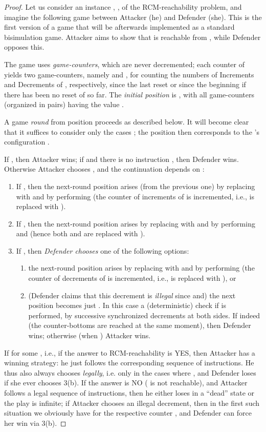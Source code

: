 \documentclass[a4paper,11pt]{article}
\begin{document}
\begin{proof}
Let us consider an instance ,
,  of the RCM-reachability problem,
and imagine the
following game between Attacker (he) and Defender (she). This is the first
version of a game that will be afterwards
implemented as a standard bisimulation game.
Attacker aims to show that  is reachable from 
, while 
Defender opposes this.

The game uses  \emph{game-counters}, which are never decremented;
each counter  of  yields two game-counters, namely 
 and , for counting the numbers of Increments and
Decrements of , respectively, since the last
reset or since the beginning if there has been no reset of  so
far.
The \emph{initial position} is 
, with all 
 game-counters (organized in pairs) having the value .

A game \emph{round} from position 
proceeds as described below.
It will become clear that 
it suffices to consider only the cases ;
the position then corresponds to the 's configuration
.

If , then Attacker wins;
if   and there is no instruction , then 
Defender wins.
Otherwise Attacker chooses , and the continuation
depends on :
\begin{enumerate}
\item
If , then the next-round position arises (from the
previous one) by replacing  with  and by performing 
 (the counter of increments of  is
incremented, i.e.,  is replaced with ).
\item
If , then the next-round position arises 
by replacing  with  and by performing 
 and  (hence both  and  are replaced
with ).
\item
If , then \emph{Defender chooses} one of the following
options:
\begin{enumerate}
\item
the next-round position arises 
by replacing  with  and by performing 
 (the counter of decrements of  is
incremented, i.e.,  is replaced with ), or
\item
	(Defender claims that this decrement is \emph{illegal} since  and)
the next position becomes just . 
In this case a (deterministic) check if  
is performed, by successive
synchronized decrements at both sides. If indeed
 (the counter-bottoms are reached at the same moment),
then Defender wins; otherwise (when )
Attacker wins.
\end{enumerate}
\end{enumerate}
If
 for some
, i.e., if the answer to RCM-reachability is YES,
then Attacker has a winning strategy: he just follows the
corresponding
sequence of instructions. He thus also always chooses 
\emph{legally},
i.e. only in the cases where , and Defender loses if
she ever chooses 3(b).
If the answer is NO ( is not reachable), and Attacker
follows a legal sequence of instructions, then he
either loses in a ``dead'' state or the play is infinite; if Attacker
chooses an illegal decrement, then in the first such situation we
obviously have
 for the respective counter , and Defender can force
her win via 3(b).



\end{proof}
\end{document}
